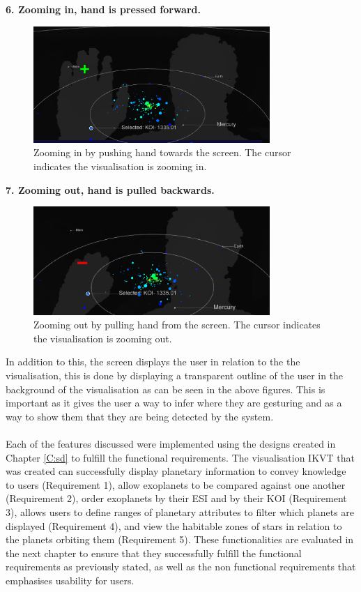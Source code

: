 \clearpage
  {\bf 6. Zooming in, hand is pressed forward.}
 \begin{figure}[H]
  \centering
      \includegraphics[width=0.8\textwidth]{images/in.PNG}
  \caption[Zooming in by pushing hand]{Zooming in by pushing hand towards the
screen. The cursor indicates the visualisation is zooming in.}
  \label{fig:in}
\end{figure}
 {\bf 7. Zooming out, hand is pulled backwards.}
\begin{figure}[H]
  \centering
      \includegraphics[width=0.8\textwidth]{images/out.PNG}
\caption[Zooming out by pulling hand]{Zooming out by pulling hand from the
screen. The cursor indicates the visualisation is zooming out.}
  \label{fig:out}
\end{figure}


In addition to this, the screen displays the user in relation to the
the visualisation, this is done by displaying a transparent outline of
the user in the background of the visualisation as can be seen in the above
figures. This is important as it gives the user a way to infer where they are
gesturing and as a way to show them that they are being detected by the system.
\\\\
Each of the features discussed were implemented using the designs created in
Chapter \ref{C:sd} to fulfill the functional requirements.
The visualisation IKVT that was created can successfully display planetary
information to convey knowledge to users (Requirement 1), allow exoplanets to be
compared against one another (Requirement 2), order exoplanets by their ESI and
by their KOI (Requirement 3), allows users to define ranges of planetary
attributes to filter which planets are displayed (Requirement 4), and view the
habitable zones of stars in
relation to the planets orbiting them (Requirement 5). These functionalities
are evaluated in the next chapter to ensure that they successfully fulfill the
functional requirements as previously stated, as well as the non functional
requirements that emphasises usability for users.




